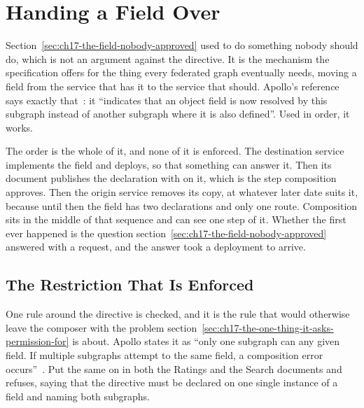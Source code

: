 \section{Handing a Field Over}
\label{sec:ch17-handing-a-field-over}

%
Section~\ref{sec:ch17-the-field-nobody-approved} used  to do
something nobody should do, which is not an argument against the directive.
It is the mechanism the specification offers for the thing every federated
graph eventually needs, moving a field from the service that has it to the
service that should. Apollo's reference says exactly
that~\autocite{apollodirectives}: it \enquote{indicates that an object field is
now resolved by this subgraph instead of another subgraph where it is also
defined}. Used in order, it works.

%
The order is the whole of it, and none of it is enforced. The destination
service implements the field and deploys, so that something can answer it.
Then its document publishes the declaration with  on it,
which is the step composition approves. Then the origin service removes its
copy, at whatever later date suits it, because until then the field has two
declarations and only one route. Composition sits in the middle of that
sequence and can see one step of it. Whether the first ever happened is the
question section~\ref{sec:ch17-the-field-nobody-approved} answered with a
request, and the answer took a deployment to arrive.

\subsection{The Restriction That Is Enforced}

%
One rule around the directive is checked, and it is the rule that would
otherwise leave the composer with the problem
section~\ref{sec:ch17-the-one-thing-it-asks-permission-for} is about. Apollo
states it as \enquote{only one subgraph can  any given field.
If multiple subgraphs attempt to  the same field, a
composition error occurs}~\autocite{apollodirectives}. Put the same
 on  in both the
Ratings and the Search documents and  refuses, saying that the
directive must be declared on one single instance of a field and naming both
subgraphs.

